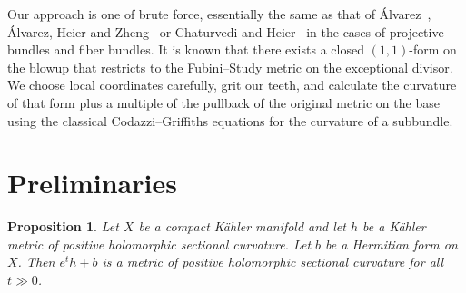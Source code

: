 \documentclass[10pt,a4paper]{amsart}
\newtheorem{prop}[theo]{Proposition}
\def\hsc{holomorphic sectional curvature}
\begin{document}
Our approach is one of brute force, essentially the same as that of
\'Alvarez~\cite{alvarez2016positive},
\'Alvarez,
Heier and Zheng~\cite{alvarez2018projectivized} or Chaturvedi and
Heier~\cite{chaturvedi2020hermitian} in the cases of projective bundles and
fiber bundles. It is known that there exists a closed $(1,1)$-form on the
blowup that restricts to the Fubini--Study metric on the exceptional divisor.
We choose local coordinates carefully, grit our teeth, and calculate the
curvature of that form plus a multiple of the pullback of the original metric
on the base using the classical Codazzi--Griffiths equations for the curvature
of a subbundle.



\section{Preliminaries}

\begin{prop}
\label{prop:positive}
Let $X$ be a compact K\"ahler manifold and let $h$ be a K\"ahler metric of
positive \hsc. Let $b$ be a Hermitian form on $X$.
Then $e^t h + b$ is a metric of positive \hsc{} for all $t \gg 0$.
\end{prop}
\end{document}
